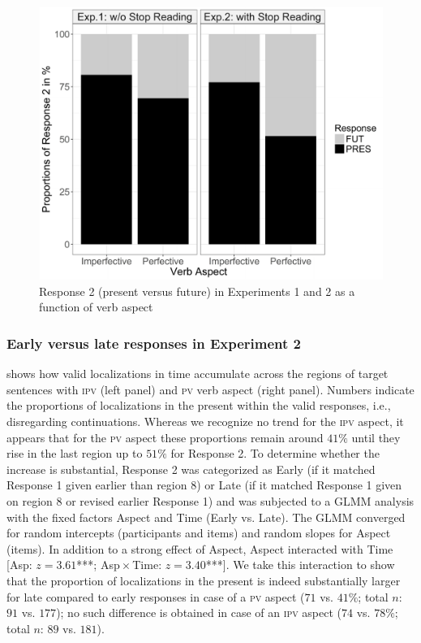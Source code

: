 \documentclass[output=paper,
colorlinks,
citecolor=brown,
newtxmath,
hidelinks
]{langscibook}
\begin{document}
\begin{figure}
\includegraphics[height=.4\textheight]{figures/06gattnar_etal_fig1.pdf}
\caption{Response 2 (present versus future) in Experiments 1 and 2 as a function of verb aspect}
\label{fig:eins}
\end{figure}

\subsubsection{Early versus late responses in Experiment 2}

 shows how valid localizations in time accumulate across the regions of target sentences with \textsc{ipv} (left panel) and \textsc{pv} verb aspect (right panel). Numbers indicate the proportions of localizations in the present within the valid responses, i.e., disregarding continuations. Whereas we recognize no trend for the \textsc{ipv} aspect, it appears that for the \textsc{pv} aspect these proportions remain around $41\%$ until they rise in the last region up to $51\%$ for Response 2. To determine whether the increase is substantial, Response 2 was categorized as Early (if it matched Response 1 given earlier than region 8) or Late (if it matched Response 1 given on region 8 or revised earlier Response 1) and was subjected to a GLMM analysis with the fixed factors Aspect and Time (Early vs. Late). The GLMM converged for random intercepts (participants and items) and random slopes for Aspect (items). In addition to a strong effect of Aspect, Aspect interacted with Time [Asp: $z=3.61$\textup{***}; Asp${}\times{}$Time: $z=3.40$\textup{***}]. We take this interaction to show that the proportion of localizations in the present is indeed substantially larger for late compared to early responses in case of a \textsc{pv} aspect ($71$ vs. $41\%$; total $n$: $91$ vs. $177$); no such difference is obtained in case of an \textsc{ipv} aspect ($74$ vs. $78\%$; total $n$: $89$ vs. $181$).
\end{document}
